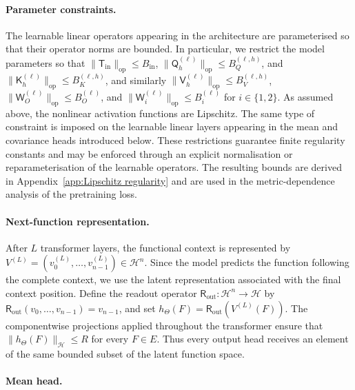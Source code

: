 \paragraph{Parameter constraints.}

The learnable linear operators appearing in the architecture are parameterised so that their operator norms are bounded. In particular, we restrict the model parameters so that \(\|\mathsf T_{\mathrm{in}}\|_{\mathrm{op}}\leqslant B_{\mathrm{in}}\), \(\|\mathsf Q_h^{(\ell)}\|_{\mathrm{op}}\leqslant B_Q^{(\ell,h)}\), and \(\|\mathsf K_h^{(\ell)}\|_{\mathrm{op}}\leqslant B_K^{(\ell,h)}\), and similarly \(\|\mathsf V_h^{(\ell)}\|_{\mathrm{op}}\leqslant B_V^{(\ell,h)}\), \(\|\mathsf W_O^{(\ell)}\|_{\mathrm{op}}\leqslant B_O^{(\ell)}\), and \(\|\mathsf W_i^{(\ell)}\|_{\mathrm{op}}\leqslant B_i^{(\ell)}\) for \(i\in\{1,2\}\). As assumed above, the nonlinear activation functions are Lipschitz. The same type of constraint is imposed on the learnable linear layers appearing in the mean and covariance heads introduced below.
These restrictions guarantee finite regularity constants and may be enforced through an explicit normalisation or reparameterisation of the learnable operators. The resulting bounds are derived in Appendix~\ref{app:Lipschitz regularity} and are used in the metric-dependence analysis of the pretraining loss.

\paragraph{Next-function representation.}

After \(L\) transformer layers, the functional context is represented by \(V^{(L)}=(v_0^{(L)},\ldots,v_{n-1}^{(L)})\in\mathcal H^n\). Since the model predicts the function following the complete context, we use the latent representation associated with the final context position. Define the readout operator \(\mathsf R_{\mathrm{out}}:\mathcal H^n\to\mathcal H\) by \(\mathsf R_{\mathrm{out}}(v_0,\ldots,v_{n-1})=v_{n-1}\), and set \(h_\Theta(F)=\mathsf R_{\mathrm{out}}(V^{(L)}(F))\).
The componentwise projections applied throughout the transformer ensure that \(\|h_\Theta(F)\|_{\mathcal H}\leqslant R\) for every \(F\in E\). Thus every output head receives an element of the same bounded subset of the latent function space.

\paragraph{Mean head.}


